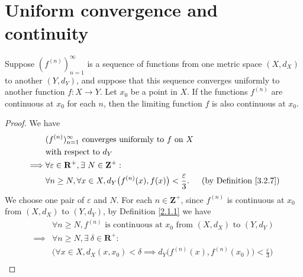 \section{Uniform convergence and continuity}\label{sec 3.3}

\begin{theorem}\label{3.3.1}
    Suppose \((f^{(n)})_{n = 1}^\infty\) is a sequence of functions from one metric space \((X, d_X)\) to another \((Y, d_Y)\), and suppose that this sequence converges uniformly to another function \(f : X \to Y\).
    Let \(x_0\) be a point in \(X\).
    If the functions \(f^{(n)}\) are continuous at \(x_0\) for each \(n\), then the limiting function \(f\) is also continuous at \(x_0\).
\end{theorem}

\begin{proof}
    We have
    \begin{align*}
                 & (f^{(n)})_{n = 1}^\infty \text{ converges uniformly to } f \text{ on } X                                                       \\
                 & \text{with respect to } d_Y                                                                                                    \\
        \implies & \forall \varepsilon \in \mathbf{R}^+, \exists\ N \in \mathbf{Z}^+ :                                                            \\
                 & \forall n \geq N, \forall x \in X, d_Y\big(f^{(n)}(x), f(x)\big) < \frac{\varepsilon}{3}. & \text{(by Definition \ref{3.2.7})}
    \end{align*}
    We choose one pair of \(\varepsilon\) and \(N\).
    For each \(n \in \mathbf{Z}^+\), since \(f^{(n)}\) is continuous at \(x_0\) from \((X, d_X)\) to \((Y, d_Y)\), by Definition \ref{2.1.1} we have
    \begin{align*}
                 & \forall n \geq N, f^{(n)} \text{ is continuous at } x_0 \text{ from } (X, d_X) \text{ to } (Y, d_Y)                                                                                         \\
        \implies & \forall n \geq N, \exists\ \delta \in \mathbf{R}^+ :                                                                                                                                        \\
                 & \Big(\forall x \in X, d_X(x, x_0) < \delta \implies d_Y\big(f^{(n)}(x), f^{(n)}(x_0)\big) < \frac{\varepsilon}{3}\Big)                                                                      \\

\end{align*}
\end{proof}
